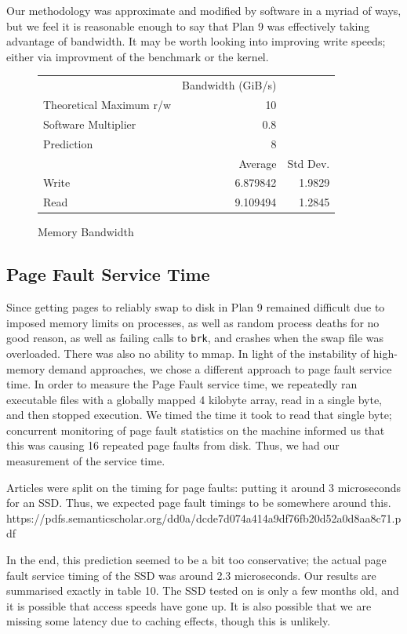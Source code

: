 \documentclass[letterpaper,twocolumn,10pt]{article}
\begin{document}
Our methodology was approximate and modified by software in a myriad of ways, but we feel it
is reasonable enough to say that Plan 9 was effectively taking advantage of bandwidth. It may
be worth looking into improving write speeds; either via improvment of the benchmark or the 
kernel.

\begin{figure}
	\centering
    \begin{tabular}{l r r}
      & Bandwidth (GiB/s)\\
      Theoretical Maximum r/w & 10\\
      Software Multiplier & 0.8 \\
      Prediction & 8\\
                   & Average & Std Dev.\\
      Write & 6.879842 & 1.9829 \\
      Read\protect\footnotemark & 9.109494  & 1.2845
\end{tabular}
\caption{Memory Bandwidth}
\label{tab:memorybandwidth}
\end{figure}
\subsection{Page Fault Service Time}
Since getting pages to reliably swap to disk in Plan 9 remained difficult due to imposed memory limits on processes, as well as random process deaths for no good reason, as well as failing calls to \texttt{brk}, and crashes when the swap file was overloaded. There was also no ability to mmap. In light of the instability of high-memory demand approaches, we chose a different approach to page fault service time. In order to measure the Page Fault service time, we repeatedly ran executable files with a globally
mapped 4 kilobyte array, read in a single byte, and then stopped execution. We timed the time it took to read that single byte; concurrent monitoring of page fault statistics on the machine informed us that this was causing 16 repeated page faults from disk. Thus, we had our measurement of the service time. 

Articles were split on the timing for page faults: putting it around 3 microseconds for an SSD. Thus, we expected page fault timings to be somewhere around this. 
https://pdfs.semanticscholar.org/dd0a/dcde7d074a414a9df76fb20d52a0d8aa8c71.pdf

In the end, this prediction seemed to be a bit too conservative; the actual page fault service timing of the SSD was around 2.3 microseconds. Our results are summarised exactly in table 10. The SSD tested on is only a few months old, and it is possible that access speeds have gone up. It is also possible that we are missing some latency due to caching effects, though this is unlikely. 
\end{document}
